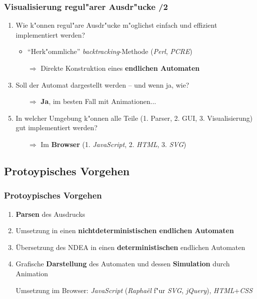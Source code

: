\documentclass[ignorenonframetext]{beamer}
\begin{document}
\begin{frame}
    \frametitle{Visualisierung regul"arer Ausdr"ucke /2}

	\begin{enumerate}
		\item Wie k"onnen regul"are Ausdr"ucke m"oglichst einfach und effizient implementiert werden?
		\begin{itemize}
			\item "`Herk"ommliche"' \textit{backtracking}-Methode (\textit{Perl}, \textit{PCRE})
			\item[$\Rightarrow$] Direkte Konstruktion eines \textbf{endlichen Automaten}
		\end{itemize}
        \item[]
        \item Soll der Automat dargestellt werden -- und wenn ja, wie?
        \begin{itemize}
            \item[$\Rightarrow$] \textbf{Ja}, im besten Fall mit Animationen...
        \end{itemize}
        \item[]
        \item In welcher Umgebung k"onnen alle Teile (1. Parser, 2. GUI, 3. Visualisierung) gut implementiert werden?
        \begin{itemize}
            \item[$\Rightarrow$] Im \textbf{Browser} (1. \textit{JavaScript}, 2. \textit{HTML}, 3. \textit{SVG})
        \end{itemize}
	\end{enumerate}
\end{frame}


\subsection{Protoypisches Vorgehen}
\begin{frame}
    \frametitle{Protoypisches Vorgehen}
	
	\begin{enumerate}
		\item \textbf{Parsen} des Ausdrucks
		\item Umsetzung in einen \textbf{nichtdeterministischen endlichen Automaten}
		\item Übersetzung des NDEA in einen \textbf{deterministischen} endlichen Automaten
		\item Grafische \textbf{Darstellung} des Automaten und dessen \textbf{Simulation} durch Animation
		\item[]
		\item[] Umsetzung im Browser: \textit{JavaScript} (\textit{Rapha\"el} f"ur \textit{SVG}, \textit{jQuery}), \textit{HTML}+\textit{CSS}
	\end{enumerate}
\end{frame}
\end{document}
